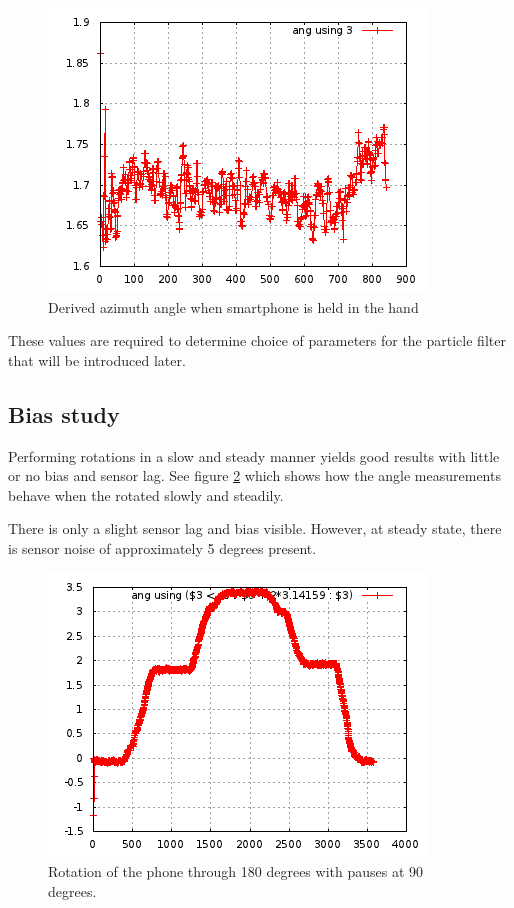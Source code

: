 \begin{figure}\centering
    \includegraphics{figures/angle_handheld_standing.png}
    \caption{Derived azimuth angle when smartphone is held in the hand\label{fig:angle_handheld_standing}}
\end{figure}



These values are required to determine choice of parameters for the particle
filter that will be introduced later.

\subsection{Bias study}

Performing rotations in a slow and steady manner yields good results with little
or no bias and sensor lag. See figure \ref{fig:angle_180_rotation_table} which 
shows how the angle measurements behave when the rotated slowly and steadily.

There is only a slight sensor lag and bias visible. However, at steady state,
there is sensor noise of approximately 5 degrees present.

\begin{figure}\centering
    \includegraphics{figures/angle_180_rotation_table.png}
    \caption{Rotation of the phone through 180 degrees with pauses at 90 degrees.\label{fig:angle_180_rotation_table}}
\end{figure}


